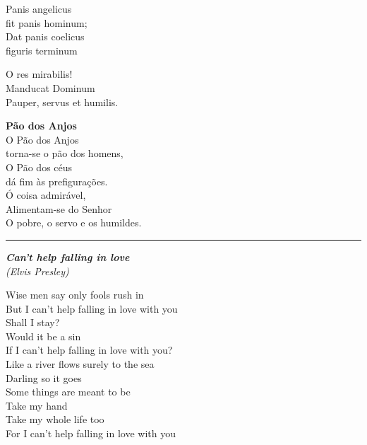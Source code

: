 \documentclass[a5paper,9pt]{memoir}
\begin{document}
{\begin{paracol}{2}
{\vspace{-0.2cm}
Panis angelicus \\ fit panis hominum;\\
Dat panis coelicus \\ figuris terminum

\vspace{-0.2cm}
O res mirabilis!\\
Manducat Dominum\\
Pauper, servus et humilis.
}
\switchcolumn

\textbf{Pão dos Anjos}\\

\vspace{-0.7cm}
O Pão dos Anjos \\ torna-se o pão dos homens,\\
O Pão dos céus \\ dá fim às prefigurações.\\

\vspace{-0.7cm}
Ó coisa admirável,\\
Alimentam-se do Senhor\\
O pobre, o servo e os humildes.
\end{paracol}

\noindent 
{\color{mygray}\hrule}

\begin{paracol}{2}
\small
{}
\setlength{\parindent}{0em}
{\itshape
\textbf{Can't help falling in love}\\
(Elvis Presley)\\

\vspace{-0.3cm}

Wise men say only fools rush in\\
But I can't help falling in love with you\\
Shall I stay?\\
Would it be a sin\\
If I can't help falling in love with you?\\
Like a river flows surely to the sea\\
Darling so it goes\\
Some things are meant to be\\

\vspace{-0.5cm}
Take my hand \\
Take my whole life too\\
For I can't help falling in love with you
}


\end{paracol}}
\end{document}
